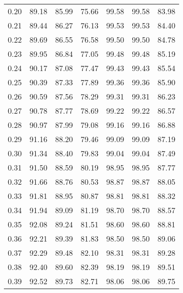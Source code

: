 \begin{tabular}{|c|c|c|c|c|c|c|}
      0.20 &     89.18 &     85.99 &      75.66 &   99.58 &      99.58 &         83.98 \\
      0.21 &     89.44 &     86.27 &      76.13 &   99.53 &      99.53 &         84.40 \\
      0.22 &     89.69 &     86.55 &      76.58 &   99.50 &      99.50 &         84.78 \\
      0.23 &     89.95 &     86.84 &      77.05 &   99.48 &      99.48 &         85.19 \\
      0.24 &     90.17 &     87.08 &      77.47 &   99.43 &      99.43 &         85.54 \\
      0.25 &     90.39 &     87.33 &      77.89 &   99.36 &      99.36 &         85.90 \\
      0.26 &     90.59 &     87.56 &      78.29 &   99.31 &      99.31 &         86.23 \\
      0.27 &     90.78 &     87.77 &      78.69 &   99.22 &      99.22 &         86.57 \\
      0.28 &     90.97 &     87.99 &      79.08 &   99.16 &      99.16 &         86.88 \\
      0.29 &     91.16 &     88.20 &      79.46 &   99.09 &      99.09 &         87.19 \\
      0.30 &     91.34 &     88.40 &      79.83 &   99.04 &      99.04 &         87.49 \\
      0.31 &     91.50 &     88.59 &      80.19 &   98.95 &      98.95 &         87.77 \\
      0.32 &     91.66 &     88.76 &      80.53 &   98.87 &      98.87 &         88.05 \\
      0.33 &     91.81 &     88.95 &      80.87 &   98.81 &      98.81 &         88.32 \\
      0.34 &     91.94 &     89.09 &      81.19 &   98.70 &      98.70 &         88.57 \\
      0.35 &     92.08 &     89.24 &      81.51 &   98.60 &      98.60 &         88.81 \\
      0.36 &     92.21 &     89.39 &      81.83 &   98.50 &      98.50 &         89.06 \\
      0.37 &     92.29 &     89.48 &      82.10 &   98.31 &      98.31 &         89.28 \\
      0.38 &     92.40 &     89.60 &      82.39 &   98.19 &      98.19 &         89.51 \\
      0.39 &     92.52 &     89.73 &      82.71 &   98.06 &      98.06 &         89.75 \\

\end{tabular}
